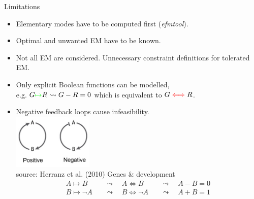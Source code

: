 \documentclass{beamer}
\begin{document}
\begin{frame}{Limitations}
\begin{itemize}
    \item Elementary modes have to be computed first (\emph{efmtool}).
    \item Optimal and unwanted EM have to be known.
    \item Not all EM are considered. Unnecessary constraint definitions for tolerated EM. 
    \item Only explicit Boolean functions can be modelled, \\
    e.g. $G \textcolor{green}{\mapsto} R \leadsto G -R = 0$
    which is equivalent to  $G  \textcolor{red}{\iff} R$.
    \item Negative feedback loops cause infeasibility. \\
        \includegraphics[width=0.3\textwidth]{grafik/feedbackloop} \\
        \tiny{source: Herranz et al. (2010) Genes \& development} \\
        \normalsize
\begin{align*}
    A \mapsto B        & \quad \leadsto \quad A \iff B       & \quad \leadsto \quad A - B = 0 \\
    B \mapsto \neg A   &  \quad \leadsto \quad  B \iff \neg A & \quad \leadsto \quad A + B = 1  \\
\end{align*}

\end{itemize}
\end{frame}



\end{document}
